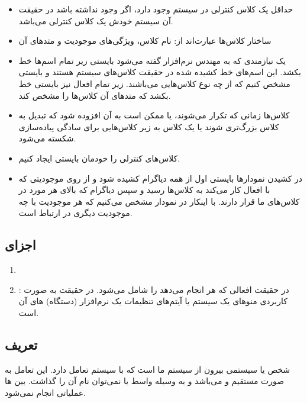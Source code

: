 \begin{itemize}
    \item حداقل یک کلاس کنترلی در سیستم وجود دارد، اگر وجود نداشته باشد در حقیقت
    آن سیستم خودش یک کلاس کنترلی می‌باشد.
    \item ساختار کلاس‌ها عبارت‌اند از: نام کلاس، ویژگی‌های موجودیت و متد‌های آن
    \item یک نیازمندی که به مهندس نرم‌افزار گفته می‌شود بایستی زیر تمام اسم‌ها
    خط بکشد. این اسم‌های خط کشیده شده در حقیقت کلاس‌های سیستم هستند و بایستی
    مشخص کنیم که از چه نوع کلاس‌هایی می‌باشند. زیر تمام افعال نیز بایستی خط بکشد
    که متد‌های آن کلاس‌ها را مشخص کند.
    \item کلاس‌ها زمانی که تکرار می‌شوند، یا ممکن است به آن افزوده شود که تبدیل
    به کلاس بزرگ‌تری شوند یا یک کلاس به زیر کلاس‌هایی برای سادگی پیاده‌سازی
    شکسته می‌شود.
    \item کلاس‌های کنترلی را خودمان بایستی ایجاد کنیم.
    \item در کشیدن نمودار‌ها بایستی اول از همه  دیاگرام کشیده شود و
    از روی موجودیتی که با افعال کار می‌کند به کلاس‌ها رسید و سپس دیاگرام
     که بالای هر مورد در  کلاس‌های ما قرار
    دارند. با اینکار در نمودار  مشخص می‌کنیم که هر موجودیت با چه
    موجودیت دیگری در ارتباط است.
\end{itemize}

\subsection{اجزای }

\begin{enumerate}
    \item {}
    \item {}: در حقیقت افعالی که هر  انجام می‌دهد را شامل
    می‌شود. در حقیقت به صورت کاربردی منو‌های یک سیستم یا آیتم‌های تنظیمات یک
    نرم‌افزار (دستگاه) های آن است.
\end{enumerate}

\subsection{تعریف }

شخص یا سیستمی بیرون از سیستم ما است که با سیستم تعامل دارد. این تعامل به صورت
مستقیم و  می‌باشد و به وسیله واسط یا  نمی‌توان نام
آن را  گذاشت. بین ها عملیاتی انجام نمی‌شود.

